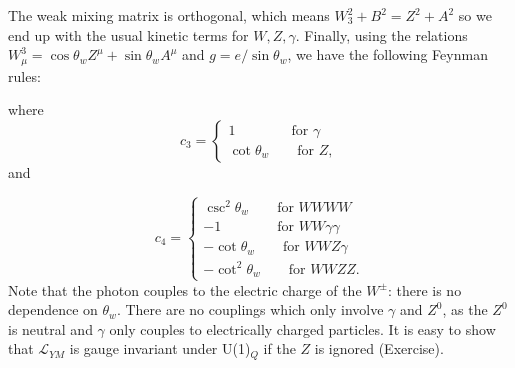 The weak mixing matrix is orthogonal, which means $W_3^2 + B^2 = Z^2 + A^2$ so we end up with the usual kinetic terms for $W, Z, \gamma$. Finally, using the relations $W_\mu^3 = \cos\theta_wZ^\mu + \sin\theta_w A^\mu$ and $g=e/\sin\theta_w$, we have the following Feynman rules:
\newline
\begin{figure}[!h]
  \centering
  \hfill
\end{figure}
\newline
where 
\begin{equation}
c_3 =
\begin{cases}
1 \qquad \qquad \text{for } \gamma\\
\cot\theta_w \qquad \text{for } Z,
\end{cases}
\end{equation}
and

\begin{equation}
c_4 =
\begin{cases}
\csc^2\theta_w \qquad \text{for } WWWW\\
-1 \qquad \qquad \text{for } WW\gamma \gamma \\
-\cot\theta_w \qquad \text{for } WWZ \gamma \\
-\cot^2\theta_w \qquad \text{for } WWZZ.
\end{cases}
\end{equation}
Note that the photon couples to the electric charge of the $W^\pm$: there is no dependence on $\theta_w$. There are no couplings which only involve $\gamma$ and $Z^0$, as the $Z^0$ is neutral and $\gamma$ only couples to electrically charged particles. It is easy to show that $\mathcal{L}_{YM}$ is gauge invariant under U(1)$_Q$ if the $Z$ is ignored (Exercise). 
%
